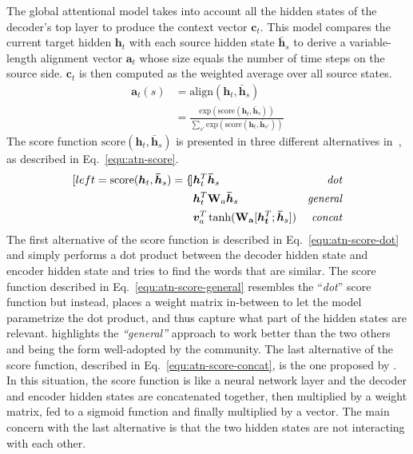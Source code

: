  The global attentional model takes into account all the hidden states of the decoder's top layer to produce the context vector $\bm{c}_t$. This model compares the current target hidden $\bm{h}_t$ with each source hidden state $\bm{\bar{h}}_s$ to derive a variable-length alignment vector $\bm{a}_t$ whose size equals the number of time steps on the source side.
 $\bm{c}_t$ is then computed as the weighted average over all source states.
 \begin{align}
    \bm{a}_t(s) &= \mathrm{align}(\bm{h}_t, \bm{\bar{h}}_s)\\
    \label{equ:atn-a_t}
    &= \frac{\mathrm{exp}(\mathrm{score}(\bm{h}_t, \bm{\bar{h}}_s))}{\sum_{s'} \mathrm{exp}(\mathrm{score}(\bm{h}_t, \bm{\bar{h}}_{s'}))}
 \end{align}
The score function $\mathrm{score}(\bm{h}_t, \bm{\bar{h}}_s)$ is presented in three different alternatives in~\citet{1508.04025}, as described in Eq.~\ref{equ:atn-score}.
\begin{subequations}
    \label{equ:atn-score}
    \begin{align}[left ={\mathrm{score}(\bm{h}_t, \bm{\bar{h}}_s) = \empheqlbrace}]
        & \bm{h}_t^T \bm{\bar{h}}_s & \mathit{dot} \label{equ:atn-score-dot}\\
        & \bm{h}_t^T \mathbf{W}_a \bm{\bar{h}}_s & \mathit{general} \label{equ:atn-score-general}\\
        & \bm{v}_a^T \tanh ( \mathbf{W_a} [\bm{h_t}^T;\bm{\bar{h}}_s]) & \mathit{concat} \label{equ:atn-score-concat}
    \end{align}
\end{subequations}
The first alternative of the score function is described in Eq.~\ref{equ:atn-score-dot} and simply performs a dot product between the decoder hidden state and encoder hidden state and tries to find the words that are similar.
The score function described in Eq.~\ref{equ:atn-score-general} resembles the ``\textit{dot}'' score function but instead, places a weight matrix in-between to let the model parametrize the dot product, and thus capture what part of the hidden states are relevant. \citet{youtube-nmt-attention} highlights the \textit{``general''} approach to work better than the two others and being the form well-adopted by the community.
The last alternative of the score function, described in Eq.~\ref{equ:atn-score-concat}, is the one proposed by \citet{1409.0473}. In this situation, the score function is like a neural network layer and the decoder and encoder hidden states are concatenated together, then multiplied by a weight matrix, fed to a sigmoid function and finally multiplied by a vector. The main concern with the last alternative is that the two hidden states are not interacting with each other.

